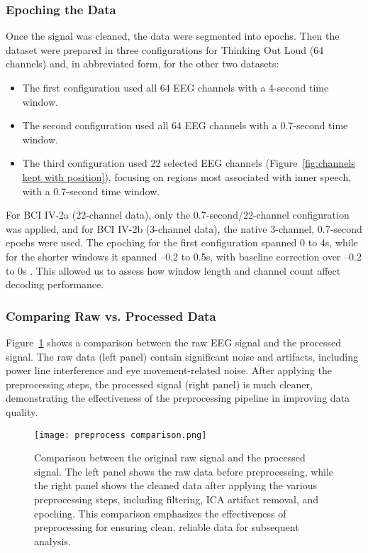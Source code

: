 \documentclass[pdflatex,sn-mathphys-num]{sn-jnl}%
\theoremstyle{thmstyleone}%
\theoremstyle{thmstyletwo}%
\theoremstyle{thmstylethree}%
\begin{document}
\subsubsection{Epoching the Data}\label{subsec7}

Once the signal was cleaned, the data were segmented into epochs. Then the dataset were prepared in three configurations for Thinking Out Loud (64 channels) and, in abbreviated form, for the other two datasets:

\begin{itemize}
    \item The first configuration used all 64 EEG channels with a 4-second time window.
    \item The second configuration used all 64 EEG channels with a 0.7-second time window.
    \item The third configuration used 22 selected EEG channels (Figure~\ref{fig:channels kept with position}), focusing on regions most associated with inner speech, with a 0.7-second time window.
\end{itemize}

For BCI IV-2a (22-channel data), only the 0.7-second/22-channel configuration was applied, and for BCI IV-2b (3-channel data), the native 3-channel, 0.7-second epochs were used. The epoching for the first configuration spanned 0 to 4s, while for the shorter windows it spanned –0.2 to 0.5s, with baseline correction over –0.2 to 0s \cite{Kappenman2021}. This allowed us to assess how window length and channel count affect decoding performance.


\subsubsection{Comparing Raw vs. Processed Data}\label{subsec8}

Figure~\ref{fig:preprocess comparison} shows a comparison between the raw EEG signal and the processed signal. The raw data (left panel) contain significant noise and artifacts, including power line interference and eye movement-related noise. After applying the preprocessing steps, the processed signal (right panel) is much cleaner, demonstrating the effectiveness of the preprocessing pipeline in improving data quality.

\begin{figure}[H]
    \centering
    \texttt{[image: preprocess comparison.png]}
    \caption{Comparison between the original raw signal and the processed signal. The left panel shows the raw data before preprocessing, while the right panel shows the cleaned data after applying the various preprocessing steps, including filtering, ICA artifact removal, and epoching. This comparison emphasizes the effectiveness of preprocessing for ensuring clean, reliable data for subsequent analysis.}
    \label{fig:preprocess comparison}
\end{figure}
\end{document}
